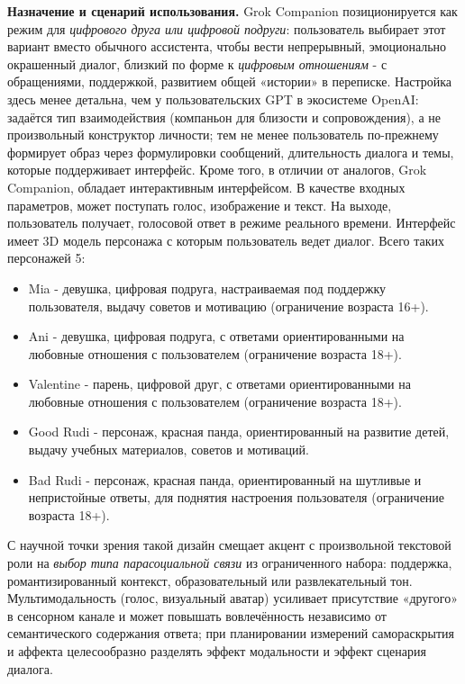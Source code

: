 \documentclass[areasetadvanced]{scrartcl}
\begin{document}
\textbf{Назначение и сценарий использования.} Grok Companion позиционируется как режим для \emph{цифрового друга или цифровой подруги}: 
пользователь выбирает этот вариант вместо обычного ассистента, чтобы вести непрерывный, эмоционально окрашенный диалог, 
близкий по форме к \emph{цифровым отношениям} - с обращениями, поддержкой, развитием общей «истории» в переписке.
 Настройка здесь менее детальна, чем у пользовательских GPT в экосистеме OpenAI: задаётся тип взаимодействия 
 (компаньон для близости и сопровождения), а не произвольный конструктор личности; тем не менее пользователь по-прежнему формирует образ через формулировки
  сообщений, длительность диалога и темы, которые поддерживает интерфейс. Кроме того, в отличии от аналогов, Grok Companion, обладает 
  интерактивным интерфейсом. В качестве входных параметров, может поступать голос, изображение и текст. На выходе, пользователь получает, 
  голосовой ответ в режиме реального времени. Интерфейс имеет 3D модель персонажа с которым пользователь ведет диалог. Всего таких персонажей 5: 
  \begin{itemize}
    \item Mia - девушка, цифровая подруга, настраиваемая под поддержку пользователя, выдачу советов и мотивацию (ограничение возраста 16+).
    \item Ani - девушка, цифровая подруга, с ответами ориентированными на любовные отношения с пользователем (ограничение возраста 18+). 
    \item Valentine - парень, цифровой друг, с ответами ориентированными на любовные отношения с пользователем (ограничение возраста 18+).
    \item Good Rudi - персонаж, красная панда, ориентированный на развитие детей, выдачу учебных материалов, советов и мотиваций.
    \item Bad Rudi - персонаж, красная панда, ориентированный на шутливые и непристойные ответы, для поднятия настроения пользователя (ограничение возраста 18+).
  \end{itemize}

С научной точки зрения такой дизайн смещает акцент с произвольной текстовой роли на \emph{выбор типа парасоциальной связи} из ограниченного набора: поддержка, романтизированный контекст, образовательный или развлекательный тон. Мультимодальность (голос, визуальный аватар) усиливает присутствие «другого» в сенсорном канале и может повышать вовлечённость независимо от семантического содержания ответа; при планировании измерений самораскрытия и аффекта целесообразно разделять эффект модальности и эффект сценария диалога.
\end{document}
